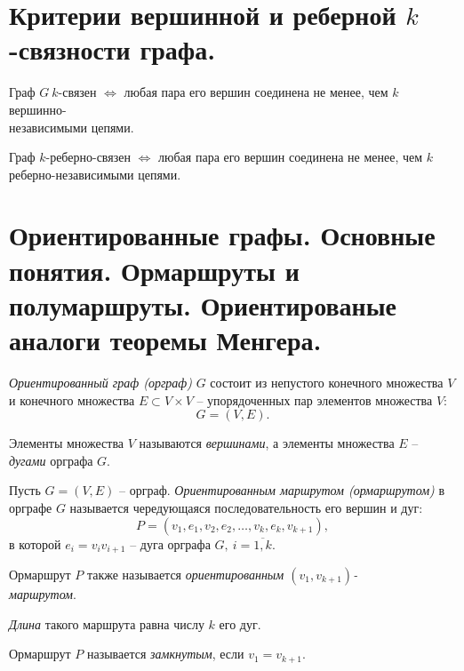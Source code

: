 \section{Критерии вершинной и реберной $k$-связности графа.}

\begin{corollary}
    Граф $ G \ k $-связен $ \iff $ любая пара его вершин соединена не менее, чем $ k $ вершинно-\\независимыми цепями.
\end{corollary}

\begin{corollary}
    Граф $ k $-реберно-связен $ \iff $ любая пара его вершин соединена не менее, чем $ k $ реберно-независимыми цепями.
\end{corollary}

\section{Ориентированные графы. Основные понятия. Ормаршруты и полумаршруты. Ориентированые аналоги теоремы Менгера.}

\begin{definition}
    \emph{Ориентированный граф (орграф)} $ G $ состоит из непустого конечного множества $ V $ и конечного множества $ E \subset V \times V $ -- упорядоченных пар элементов множества $ V $:
    \[
        G = (V,E).
    \]

    Элементы множества $ V $ называются \emph{вершинами}, а элементы множества $ E $ -- \emph{дугами} орграфа $ G $.
\end{definition}

\begin{definition}
    Пусть $ G = (V,E) $ -- орграф. \emph{Ориентированным маршрутом (ормаршрутом)} в орграфе $ G $ называется чередующаяся последовательность его вершин и дуг:
    \[
        P = (v_1,e_1,v_2,e_2,\ldots,v_k,e_k,v_{k+1}),
    \]
    в которой $ e_i = v_iv_{i+1} $ -- дуга орграфа $ G, \ i = \overline{1,k} $.

    Ормаршрут $ P $ также называется \emph{ориентированным $ (v_1,v_{k+1}) $-\\маршрутом}.

    \emph{Длина} такого маршрута равна числу $ k $ его дуг.

    Ормаршрут $ P $ называется \emph{замкнутым}, если $ v_1 = v_{k+1} $.
\end{definition}

